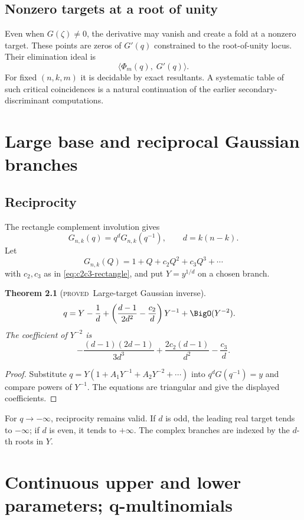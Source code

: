 \documentclass[11pt,letterpaper,oneside,openany]{book}
\newtheorem{theorem}{Theorem}[chapter]
\theoremstyle{definition}
\theoremstyle{remark}
\newcommand{\statusproved}{\textcolor{provedgreen}{\textsc{proved}}}
\begin{document}
\section{Nonzero targets at a root of unity}
Even when \(G(\zeta)\ne0\), the derivative may vanish and create a fold at a
nonzero target.  These points are zeros of
\(G'(q)\) constrained to the root-of-unity locus.  Their elimination ideal is
\[
 \langle \Phi_m(q),\;G'(q)\rangle.
\]
For fixed \((n,k,m)\) it is decidable by exact resultants.  A systematic table
of such critical coincidences is a natural continuation of the earlier
secondary-discriminant computations.

\chapter{Large base and reciprocal Gaussian branches}

\section{Reciprocity}
The rectangle complement involution gives
\begin{equation}
 G_{n,k}(q)=q^dG_{n,k}(q^{-1}),
 \qquad d=k(n-k).
 \label{eq:gaussian-reciprocity}
\end{equation}
Let
\[
 G_{n,k}(Q)=1+Q+c_2Q^2+c_3Q^3+\cdots
\]
with \(c_2,c_3\) as in \cref{eq:c2c3-rectangle}, and put
\(Y=y^{1/d}\) on a chosen branch.

\begin{theorem}[\statusproved\ Large-target Gaussian inverse]
\begin{align}
 q={}&Y-\frac1d
 +\left(\frac{d-1}{2d^2}-\frac{c_2}{d}\right)Y^{-1}
 +\BigO(Y^{-2}).
 \label{eq:gaussian-large-q}
\end{align}
The coefficient of \(Y^{-2}\) is
\[
 -\frac{(d-1)(2d-1)}{3d^3}
 +\frac{2c_2(d-1)}{d^2}-\frac{c_3}{d}.
\]
\end{theorem}
\begin{proof}
Substitute
\(q=Y(1+A_1Y^{-1}+A_2Y^{-2}+\cdots)\) into
\(q^dG(q^{-1})=y\) and compare powers of \(Y^{-1}\).  The equations are
triangular and give the displayed coefficients.
\end{proof}

For \(q\to-\infty\), reciprocity remains valid.  If \(d\) is odd, the leading
real target tends to \(-\infty\); if \(d\) is even, it tends to
\(+\infty\).  The complex branches are indexed by the \(d\)-th roots in \(Y\).

\chapter{Continuous upper and lower parameters; q-multinomials}
\end{document}
